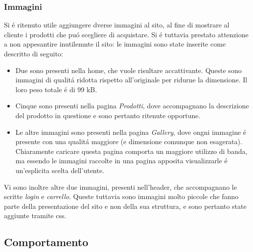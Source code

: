 		\subsubsection{Immagini}
			Si \'e ritenuto utile aggiungere dverse immagini al sito, al fine di mostrare al cliente i prodotti che pu\'o scegliere di acquistare.
			Si \'e tuttavia prestato attenzione a non appesantire inutilemnte il sito: le immagini sono state inserite come descritto di seguito:
			\begin{itemize}
			\item Due sono presenti nella home, che vuole risultare accattivante. Queste sono immagini di qualit\'a ridotta rispetto all'originale per ridurne la dimensione. Il loro peso totale \'e di 99 kB.
			\item Cinque sono presenti nella pagina \emph{Prodotti}, dove accompagnano la descrizione del prodotto in questione e sono pertanto ritenute opportune.
			\item Le altre immagini sono presenti nella pagina \emph{Gallery}, dove ongni immagine \'e presente con una qualit\'a maggiore (e dimensione comunque non esagerata). Chiaramente caricare questa pagina comporta un maggiore utilizzo di banda, ma essendo le immagini raccolte in una pagina apposita visualizzarle \'e un'esplicita scelta dell'utente.
			\end{itemize}
			Vi sono inoltre altre due immagini, presenti nell'header, che accompagnano le scritte \emph{login} e \emph{carrello}.
			Queste tuttavia sono immagini molto piccole che fanno parte della presentazione del sito e non della sua struttura, e sono pertanto state aggiunte tramite css.


    \subsection{Comportamento}
